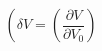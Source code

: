 \begin{equation}
\label{eq:deltaV}
\left(\delta V = \left( \frac{\partial{V}}{\partial{V_0}}\right)
\end{equation}